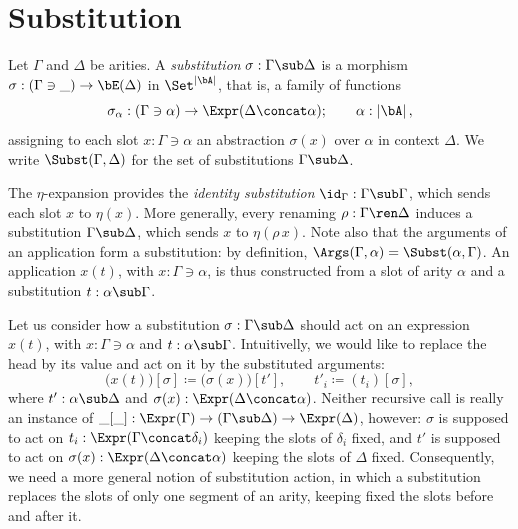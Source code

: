 \section{Substitution}

\begin{definition}
    Let $\Gamma$ and $\Delta$ be arities. A \emph{substitution} $\sigma : \Gamma \sub \Delta$ is a morphism $\sigma : (\Gamma \ni \_) \to \bE(\Delta)$ in $\Set^{\left|\bA\right|}$, that is, a family of functions
    \[
    \sigma_\alpha : (\Gamma \ni \alpha) \to \Expr(\Delta \concat \alpha); \qquad \alpha : \left|\bA\right|,
    \]
    assigning to each slot $x : \Gamma \ni \alpha$ an abstraction $\sigma(x)$ over $\alpha$ in context $\Delta$. We write $\Subst(\Gamma, \Delta)$ for the set of substitutions $\Gamma \sub \Delta$.
\end{definition}

The $\eta$-expansion provides the \emph{identity substitution} $\id_\Gamma : \Gamma \sub \Gamma$, which sends each slot $x$ to $\eta(x)$. More generally, every renaming $\rho : \Gamma \ren \Delta$ induces a substitution $\Gamma \sub \Delta$, which sends $x$ to $\eta(\rho\, x)$. Note also that the arguments of an application form a substitution: by definition, $\Args(\Gamma, \alpha) = \Subst(\alpha, \Gamma)$. An application $x(t)$, with $x : \Gamma \ni \alpha$, is thus constructed from a slot of arity $\alpha$ and a substitution $t : \alpha \sub \Gamma$.

Let us consider how a substitution $\sigma : \Gamma \sub \Delta$ should act on an expression $x(t)$, with $x : \Gamma \ni \alpha$ and $t : \alpha \sub \Gamma$. Intuitivelly, we would like to replace the head by its value and act on it by the substituted arguments:
\[
\big(x(t)\big)[\sigma] \coloneqq \big(\sigma(x)\big)[t'], \qquad t'_i \coloneqq (t_i)[\sigma],
\]
where $t' : \alpha \sub \Delta$ and $\sigma(x) : \Expr(\Delta \concat \alpha)$. Neither recursive call is really an instance of $\_[\_] : \Expr(\Gamma) \to (\Gamma \sub \Delta) \to \Expr(\Delta)$, however: $\sigma$ is supposed to act on $t_i : \Expr(\Gamma \concat \delta_i)$ keeping the slots of $\delta_i$ fixed, and $t'$ is supposed to act on $\sigma(x) : \Expr(\Delta \concat \alpha)$ keeping the slots of $\Delta$ fixed. Consequently, we need a more general notion of substitution action, in which a substitution replaces the slots of only one segment of an arity, keeping fixed the slots before and after it.

